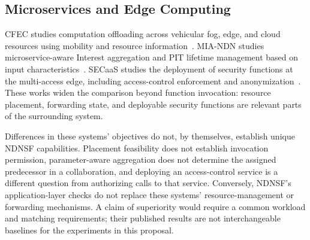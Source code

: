 \subsection{Microservices and Edge Computing}
CFEC studies computation offloading across vehicular fog, edge, and cloud resources using mobility and resource information~\cite{cfec}. MIA-NDN studies microservice-aware Interest aggregation and PIT lifetime management based on input characteristics~\cite{miandn}. SECaaS studies the deployment of security functions at the multi-access edge, including access-control enforcement and anonymization~\cite{secaas}. These works widen the comparison beyond function invocation: resource placement, forwarding state, and deployable security functions are relevant parts of the surrounding system.

Differences in these systems' objectives do not, by themselves, establish unique NDNSF capabilities. Placement feasibility does not establish invocation permission, parameter-aware aggregation does not determine the assigned predecessor in a collaboration, and deploying an access-control service is a different question from authorizing calls to that service. Conversely, NDNSF's application-layer checks do not replace these systems' resource-management or forwarding mechanisms. A claim of superiority would require a common workload and matching requirements; their published results are not interchangeable baselines for the experiments in this proposal.
